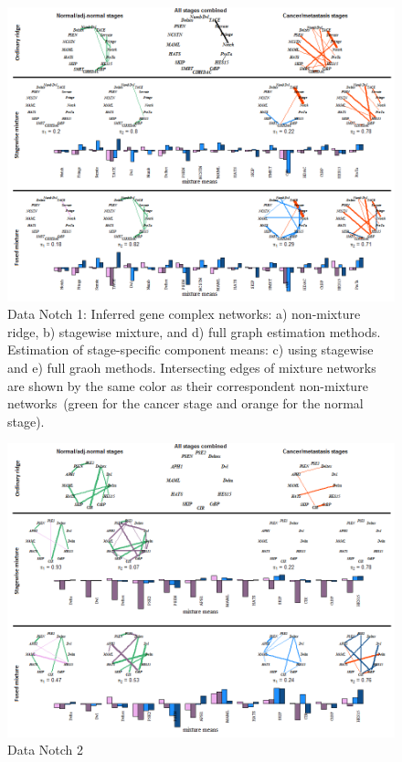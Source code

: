 \documentclass[10pt]{article}
\begin{document}
\newpage
\begin{figure}
\begin{center}
 \includegraphics[scale=.8]{notch1.png}
\end{center}
\caption{ Data Notch 1:  Inferred gene complex networks: a) non-mixture ridge, b) stagewise mixture, and d) full graph estimation methods. Estimation of stage-specific component means: c) using stagewise and e) full graoh methods. Intersecting edges of mixture networks are shown by the same color as their correspondent non-mixture networks~(green for the cancer stage and orange for the normal stage).}
\label{fig:notch1}
\end{figure}

\newpage
\begin{figure}
\begin{center}
 \includegraphics[scale=.8]{notch2.png}
\end{center}
\caption{ Data Notch 2}
\label{fig:notch2}
\end{figure}
\end{document}
